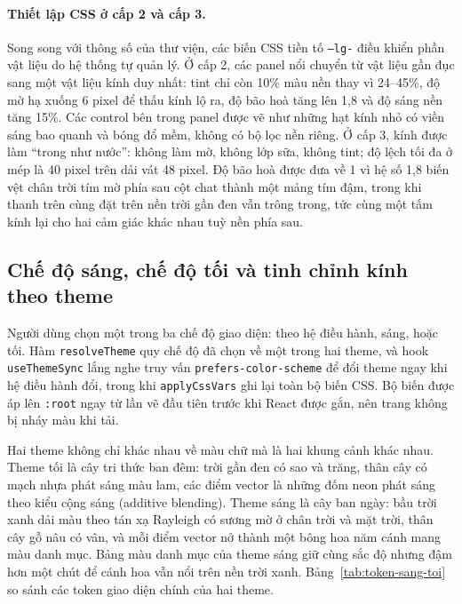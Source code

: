 \paragraph{Thiết lập CSS ở cấp 2 và cấp 3.} Song song với thông số của thư viện, các biến CSS tiền tố \texttt{--lg-} điều khiển phần vật liệu do hệ thống tự quản lý. Ở cấp 2, các panel nổi chuyển từ vật liệu gần đục sang một vật liệu kính duy nhất: tint chỉ còn 10\% màu nền thay vì 24--45\%, độ mờ hạ xuống 6 pixel để thấu kính lộ ra, độ bão hoà tăng lên 1,8 và độ sáng nền tăng 15\%. Các control bên trong panel được vẽ như những hạt kính nhỏ có viền sáng bao quanh và bóng đổ mềm, không có bộ lọc nền riêng. Ở cấp 3, kính được làm ``trong như nước'': không làm mờ, không lớp sữa, không tint; độ lệch tối đa ở mép là 40 pixel trên dải vát 48 pixel. Độ bão hoà được đưa về 1 vì hệ số 1,8 biến vệt chân trời tím mờ phía sau cột chat thành một mảng tím đậm, trong khi thanh trên cùng đặt trên nền trời gần đen vẫn trông trong, tức cùng một tấm kính lại cho hai cảm giác khác nhau tuỳ nền phía sau.

\subsection{Chế độ sáng, chế độ tối và tinh chỉnh kính theo theme}
\label{subsec:theme-sang-toi}

Người dùng chọn một trong ba chế độ giao diện: theo hệ điều hành, sáng, hoặc tối. Hàm \texttt{resolveTheme} quy chế độ đã chọn về một trong hai theme, và hook \texttt{useThemeSync} lắng nghe truy vấn \texttt{prefers-color-scheme} để đổi theme ngay khi hệ điều hành đổi, trong khi \texttt{applyCssVars} ghi lại toàn bộ biến CSS. Bộ biến được áp lên \texttt{:root} ngay từ lần vẽ đầu tiên trước khi React được gắn, nên trang không bị nháy màu khi tải.

Hai theme không chỉ khác nhau về màu chữ mà là hai khung cảnh khác nhau. Theme tối là cây tri thức ban đêm: trời gần đen có sao và trăng, thân cây có mạch nhựa phát sáng màu lam, các điểm vector là những đốm neon phát sáng theo kiểu cộng sáng (additive blending). Theme sáng là cây ban ngày: bầu trời xanh dải màu theo tán xạ Rayleigh có sương mờ ở chân trời và mặt trời, thân cây gỗ nâu có vân, và mỗi điểm vector nở thành một bông hoa năm cánh mang màu danh mục. Bảng màu danh mục của theme sáng giữ cùng sắc độ nhưng đậm hơn một chút để cánh hoa vẫn nổi trên nền trời xanh. Bảng~\ref{tab:token-sang-toi} so sánh các token giao diện chính của hai theme.

